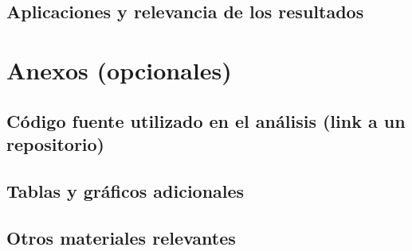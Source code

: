 \documentclass[a4paper]{report}
\begin{document}
\section{Aplicaciones y relevancia de los resultados}


\printbibliography[heading=bibintoc] %



\chapter*{Anexos (opcionales)}

\section{Código fuente utilizado en el análisis (link a un repositorio)}
\section{Tablas y gráficos adicionales}
\section{Otros materiales relevantes}
\end{document}
